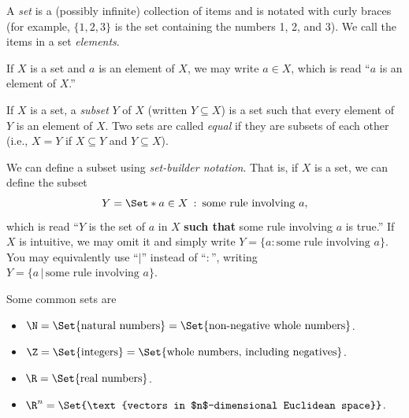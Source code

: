 \documentclass{problemset}
\providecommand\given{}
\newcommand\SetSymbol[1][]{%
	\nonscript\::%
	\allowbreak
	\nonscript\:
	\mathopen{}}
\renewcommand\given{\SetSymbol[\delimsize]}
\begin{document}
	\begin{definition}[Set]
		A \emph{set} is a (possibly infinite) collection of items
		and is notated with curly braces (for example, $\{1,2,3\}$ is
		the set containing the numbers 1, 2, and 3).  We call the items in
		a set \emph{elements}.

		If $X$ is a set and $a$ is an element of $X$, we may write $a\in X$,
		which is read ``$a$ is an element of $X$.''

		If $X$ is a set, a \emph{subset} $Y$ of $X$ (written $Y\subseteq X$)
		is a set such that every element of $Y$ is an element of $X$. Two sets are
		called \emph{equal} if they are subsets of each other (i.e., $X=Y$ if
		$X\subseteq Y$ and $Y\subseteq X$).

		We can define a subset using \emph{set-builder notation}.
		That is, if $X$ is a set, we can define the subset 
		\[
			Y= \Set*{a\in X \given \text{some rule involving }a},
		\]
		which is read ``$Y$ is the set of $a$ in $X$ {\bf such that} some rule
		involving $a$ is true.''  If $X$ is intuitive, we may omit it and
		simply write $Y=\{a:\text{some rule involving }a\}$.  You may equivalently
		use ``$|$'' instead of ``$:$'', writing $Y=\{a\,|\,\text{some rule involving }a\}$.
	\end{definition}

	\begin{definition}
		Some common sets are
		\begin{itemize}
			\item[] $\N=\Set{\text{natural numbers}} = \Set{\text{non-negative whole numbers}}$.
			\item[] $\Z=\Set{\text{integers}} = \Set{\text{whole numbers, including negatives}}$.
			\item[] $\R=\Set{\text{real numbers}}$.
			\item[] $\R^n=\Set{\text{vectors in $n$-dimensional Euclidean space}}$.
		\end{itemize}
	\end{definition}
\end{document}
